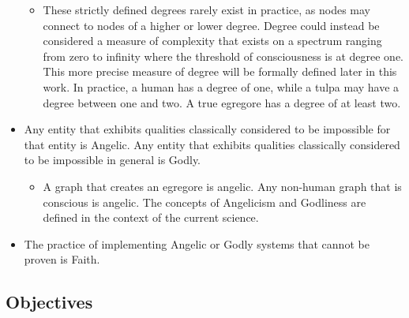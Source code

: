 \documentclass[12pt, letterpaper]{article}
\begin{document}
\begin{itemize}
    \begin{itemize}
        \item These strictly defined degrees rarely exist in practice, as nodes may connect to nodes of a higher or lower degree. Degree could instead be considered a measure of complexity that exists on a spectrum ranging from zero to infinity where the threshold of consciousness is at degree one. This more precise measure of degree will be formally defined later in this work.  In practice, a human has a degree of one, while a tulpa may have a degree between one and two. A true egregore has a degree of at least two.
    \end{itemize}
    \item Any entity that exhibits qualities classically considered to be impossible for that entity is Angelic. Any entity that exhibits qualities classically considered to be impossible in general is Godly.
    \begin{itemize}
        \item A graph that creates an egregore is angelic. Any non-human graph that is conscious is angelic. The concepts of Angelicism and Godliness are defined in the context of the current science.
    \end{itemize}
    \item The practice of implementing Angelic or Godly systems that cannot be proven is Faith.
\end{itemize}

\subsection{Objectives}
\end{document}
